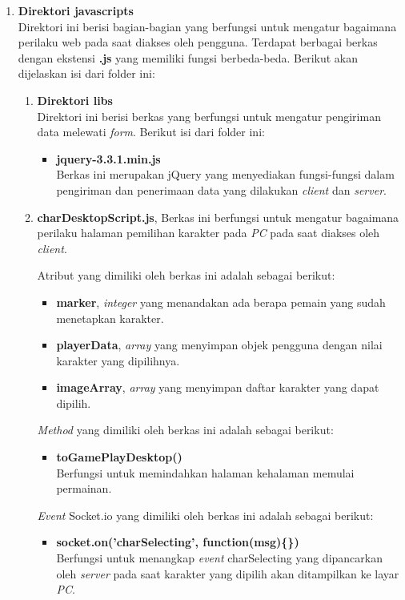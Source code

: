 \begin{enumerate}
\begin{enumerate}
		\item \textbf{Direktori javascripts} \\
		Direktori ini berisi bagian-bagian yang berfungsi untuk mengatur bagaimana perilaku web pada saat diakses oleh pengguna. Terdapat berbagai berkas dengan ekstensi \textbf{.js} yang memiliki fungsi berbeda-beda. Berikut akan dijelaskan isi dari folder ini:
		
		\begin{enumerate}
			\item \textbf{Direktori libs} \\
			Direktori ini berisi berkas yang berfungsi untuk mengatur pengiriman data melewati \textit{form}. Berikut isi dari folder ini:
			\begin{itemize}
				\item \textbf{jquery-3.3.1.min.js} \\ Berkas ini merupakan jQuery yang menyediakan fungsi-fungsi dalam pengiriman dan penerimaan data yang dilakukan \textit{client} dan \textit{server}. 
			\end{itemize}
		
			\item \textbf{charDesktopScript.js}, Berkas ini berfungsi untuk mengatur bagaimana perilaku halaman pemilihan karakter pada \textit{PC} pada saat diakses oleh \textit{client}.
			
			Atribut yang dimiliki oleh berkas ini adalah sebagai berikut:
			\begin{itemize}
				\item \textbf{marker}, \textit{integer} yang menandakan ada berapa pemain yang sudah menetapkan karakter.
				\item \textbf{playerData}, \textit{array} yang menyimpan objek pengguna dengan nilai karakter yang dipilihnya.
				\item \textbf{imageArray}, \textit{array} yang menyimpan daftar karakter yang dapat dipilih.
			\end{itemize}
		
			\textit{Method} yang dimiliki oleh berkas ini adalah sebagai berikut:
			\begin{itemize}
				\item \textbf{toGamePlayDesktop()} \\
				Berfungsi untuk memindahkan halaman kehalaman memulai permainan.
			\end{itemize}
		
			\textit{Event} Socket.io yang dimiliki oleh berkas ini adalah sebagai berikut:
			\begin{itemize}
				\item \textbf{socket.on('charSelecting', function(msg)\{\})} \\
				Berfungsi untuk menangkap \textit{event} charSelecting yang dipancarkan oleh \textit{server} pada saat karakter yang dipilih akan ditampilkan ke layar \textit{PC}.
				

\end{itemize}
\end{enumerate}
\end{enumerate}
\end{enumerate}
